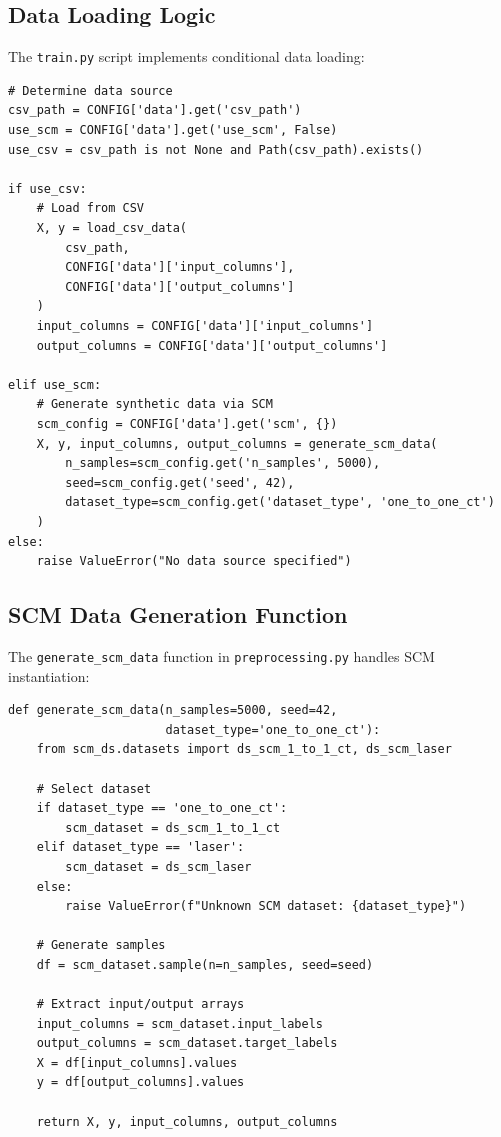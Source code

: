 \documentclass[11pt,a4paper]{article}
\begin{document}
\subsection{Data Loading Logic}

The \texttt{train.py} script implements conditional data loading:

\begin{lstlisting}[caption={Data Source Selection in train.py}]
# Determine data source
csv_path = CONFIG['data'].get('csv_path')
use_scm = CONFIG['data'].get('use_scm', False)
use_csv = csv_path is not None and Path(csv_path).exists()

if use_csv:
    # Load from CSV
    X, y = load_csv_data(
        csv_path,
        CONFIG['data']['input_columns'],
        CONFIG['data']['output_columns']
    )
    input_columns = CONFIG['data']['input_columns']
    output_columns = CONFIG['data']['output_columns']

elif use_scm:
    # Generate synthetic data via SCM
    scm_config = CONFIG['data'].get('scm', {})
    X, y, input_columns, output_columns = generate_scm_data(
        n_samples=scm_config.get('n_samples', 5000),
        seed=scm_config.get('seed', 42),
        dataset_type=scm_config.get('dataset_type', 'one_to_one_ct')
    )
else:
    raise ValueError("No data source specified")
\end{lstlisting}

\subsection{SCM Data Generation Function}

The \texttt{generate\_scm\_data} function in \texttt{preprocessing.py} handles SCM instantiation:

\begin{lstlisting}[caption={SCM Data Generation}]
def generate_scm_data(n_samples=5000, seed=42,
                      dataset_type='one_to_one_ct'):
    from scm_ds.datasets import ds_scm_1_to_1_ct, ds_scm_laser

    # Select dataset
    if dataset_type == 'one_to_one_ct':
        scm_dataset = ds_scm_1_to_1_ct
    elif dataset_type == 'laser':
        scm_dataset = ds_scm_laser
    else:
        raise ValueError(f"Unknown SCM dataset: {dataset_type}")

    # Generate samples
    df = scm_dataset.sample(n=n_samples, seed=seed)

    # Extract input/output arrays
    input_columns = scm_dataset.input_labels
    output_columns = scm_dataset.target_labels
    X = df[input_columns].values
    y = df[output_columns].values

    return X, y, input_columns, output_columns
\end{lstlisting}
\end{document}

